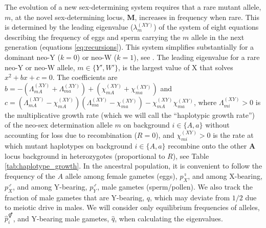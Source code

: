 \documentclass[10pt,letterpaper]{article}
\providecommand{\DIFadd}[1]{{\protect\color{blue}\uwave{#1}}} %
\providecommand{\DIFdel}[1]{{\protect\color{red}\sout{#1}}}                      %
\providecommand{\DIFaddbegin}{} %
\providecommand{\DIFaddend}{} %
\providecommand{\DIFdelbegin}{} %
\providecommand{\DIFdelend}{} %
\begin{document}
The evolution of a new sex-determining system requires that a rare mutant allele, $m$, at the novel sex-determining locus, $\mathbf{M}$, increases in frequency when rare. 
This is determined by the leading eigenvalue ($\lambda_m^{(XY)}$) of the system of eight equations describing the frequency of eggs and sperm carrying the $m$ allele in the next generation (equations \ref{eq:recursions}). %
This system simplifies substantially for a dominant neo-Y ($k=0$) or neo-W ($k=1$), see . 
The leading eigenvalue for a rare neo-Y or neo-W allele, $m\in\{Y',W'\}$, is the largest value of X that solves $x^2+ b x + c = 0$.  %
The coefficients are $b= - (\Lambda_{mA}^{(XY)} + \Lambda_{ma}^{(XY)})+(\chi_{mA}^{(XY)} + \chi_{ma}^{(XY)})$ and $c = (\Lambda_{mA}^{(XY)} - \chi_{mA}^{(XY)}) (\Lambda_{ma}^{(XY)} - \chi_{ma}^{(XY)}) - \chi_{mA}^{(XY)} \chi_{ma}^{(XY)}$, where $\Lambda_{mi}^{(XY)}>0$ is the multiplicative growth rate (which we will call the ``haplotypic growth rate'') of the neo-sex determination allele $m$ on background $i\in\{A,a\}$ without accounting for loss due to recombination ($R=0$), and $\chi_{mi}^{(XY)}>0$ is the rate at which mutant haplotypes on background $i\in\{A,a\}$ recombine onto the other $\mathbf{A}$ locus background in heterozygotes (proportional to $R$\DIFaddbegin \DIFadd{; \textcolor{red}{we call this the ``haplotypic recombination rate"(?)}}\DIFaddend ), see Table \ref{tab:haplotype_growth}.
In the ancestral population, it is convenient to follow the frequency of the $A$ allele among female gametes (eggs), $p^\female_X$, and among X-bearing, $p^\male_X$, and among Y-bearing, $p^\male_Y$, male gametes (sperm/pollen). 
We also track the fraction of male gametes that are Y-bearing, $q$, which may deviate from $1/2$ due to meiotic drive in males. 
We will consider only equilibrium frequencies of alleles, \DIFdelbegin \DIFdel{$\hat{p}^\Hermaphrodite_i$}\DIFdelend \DIFaddbegin \DIFadd{$\hat{p}^\circ_i$}\DIFaddend , and Y-bearing male gametes, $\hat{q}$, when calculating the eigenvalues.  
\end{document}
